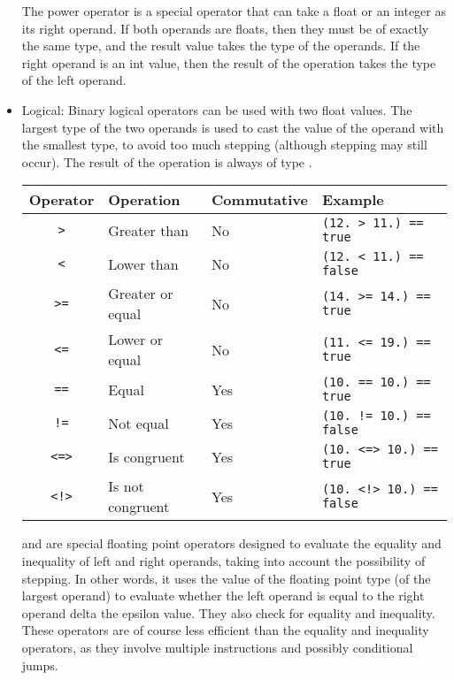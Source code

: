 \begin{itemize}
  The power operator \token{\textasciicircum{}\textasciicircum{}} is a special
  operator that can take a float or an integer as its right operand. If both
  operands are floats, then they must be of exactly the same type, and the
  result value takes the type of the operands. If the right operand is an int
  value, then the result of the operation takes the type of the left operand.

\item Logical: Binary logical operators can be used with two float values. The
  largest type of the two operands is used to cast the value of the operand with
  the smallest type, to avoid too much stepping (although stepping may still
  occur). The result of the operation is always of type .

  \begin{center}
    \vspace{-20pt}
    \begin{adjustbox}{max width=1.0\linewidth}
      \begin{tabular}{|c|lll|}
        \hline
        Operator & Operation & Commutative & Example\\[0pt]
        \hline
        \hline
        \texttt{>} & Greater than & No & \texttt{(12. > 11.) == true}\\[0pt]
        \texttt{<} & Lower than & No & \texttt{(12. < 11.) == false}\\[0pt]
        \texttt{>=} & Greater or equal & No & \texttt{(14. >= 14.) == true}\\[0pt]
        \texttt{<=} & Lower or equal & No & \texttt{(11. <= 19.) == true}\\[0pt]
        \texttt{==} & Equal & Yes & \texttt{(10. == 10.) == true}\\[0pt]
        \texttt{!=} & Not equal & Yes & \texttt{(10. != 10.) == false}\\[0pt]
        \texttt{<=>} & Is congruent & Yes & \texttt{(10. <=> 10.) == true}\\[0pt]
        \texttt{<!>} & Is not congruent & Yes & \texttt{(10. <!> 10.) == false}\\[0pt]
        \hline
      \end{tabular}
    \end{adjustbox}
  \end{center}

   \token{<=>} and \token{<!>} are special floating point operators designed
   to evaluate the equality and inequality of left and right operands, taking
   into account the possibility of stepping. In other words, it uses the
    value of the floating point type (of the largest operand)
   to evaluate whether the left operand is equal to the right operand delta the
   epsilon value. They also check for  equality and inequality.
   These operators are of course less efficient than the equality and inequality
   operators, as they involve multiple instructions and possibly conditional
   jumps.


\end{itemize}
